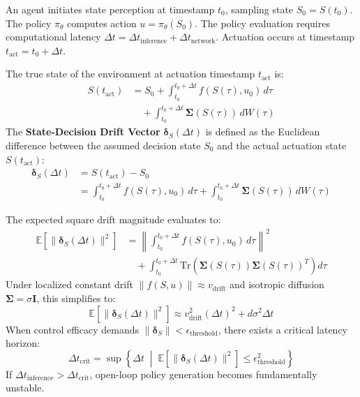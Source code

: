 \documentclass[journal,compsoc]{IEEEtran}
\begin{document}
An agent initiates state perception at timestamp $t_0$, sampling state $S_0 = S(t_0)$. The policy $\pi_\theta$ computes action $u = \pi_\theta(S_0)$. The policy evaluation requires computational latency $\Delta t = \Delta t_{\text{inference}} + \Delta t_{\text{network}}$. Actuation occurs at timestamp $t_{\text{act}} = t_0 + \Delta t$.

The true state of the environment at actuation timestamp $t_{\text{act}}$ is:
\begin{equation}
\begin{aligned}
S(t_{\text{act}}) &= S_0 + \int_{t_0}^{t_0 + \Delta t} f(S(\tau), u_0) \, d\tau \\
&\quad + \int_{t_0}^{t_0 + \Delta t} \mathbf{\Sigma}(S(\tau)) \, dW(\tau)
\end{aligned}
\end{equation}
The \textbf{State-Decision Drift Vector} $\mathbf{\delta}_S(\Delta t)$ is defined as the Euclidean difference between the assumed decision state $S_0$ and the actual actuation state $S(t_{\text{act}})$:
\begin{equation}
\begin{aligned}
\mathbf{\delta}_S(\Delta t) &= S(t_{\text{act}}) - S_0 \\
&= \int_{t_0}^{t_0 + \Delta t} f(S(\tau), u_0) \, d\tau + \int_{t_0}^{t_0 + \Delta t} \mathbf{\Sigma}(S(\tau)) \, dW(\tau)
\end{aligned}
\end{equation}

The expected square drift magnitude evaluates to:
\begin{equation}
\begin{aligned}
\mathbb{E}\left[\|\mathbf{\delta}_S(\Delta t)\|^2\right] &= \left\|\int_{t_0}^{t_0 + \Delta t} f(S(\tau), u_0) \, d\tau\right\|^2 \\
&\quad + \int_{t_0}^{t_0 + \Delta t} \text{Tr}\left(\mathbf{\Sigma}(S(\tau)) \mathbf{\Sigma}(S(\tau))^T\right) d\tau
\end{aligned}
\end{equation}
Under localized constant drift $\|f(S, u)\| \approx v_{\text{drift}}$ and isotropic diffusion $\mathbf{\Sigma} = \sigma \mathbf{I}$, this simplifies to:
\begin{equation}
\mathbb{E}\left[\|\mathbf{\delta}_S(\Delta t)\|^2\right] \approx v_{\text{drift}}^2 (\Delta t)^2 + d \sigma^2 \Delta t
\end{equation}
When control efficacy demands $\|\mathbf{\delta}_S\| < \epsilon_{\text{threshold}}$, there exists a critical latency horizon:
\begin{equation}
\Delta t_{\text{crit}} = \sup \left\{ \Delta t \;\middle|\; \mathbb{E}\left[\|\mathbf{\delta}_S(\Delta t)\|^2\right] \le \epsilon_{\text{threshold}}^2 \right\}
\end{equation}
If $\Delta t_{\text{inference}} > \Delta t_{\text{crit}}$, open-loop policy generation becomes fundamentally unstable.
\end{document}
